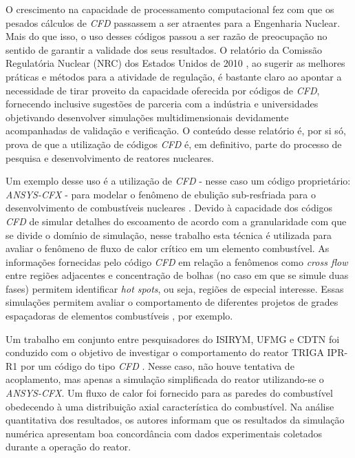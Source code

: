 





O crescimento na capacidade de processamento
computacional 
fez com que os pesados cálculos de \textit{CFD} passassem a ser atraentes 
para a Engenharia Nuclear. Mais do que isso, o uso desses códigos passou a ser razão 
de preocupação no sentido de garantir a validade dos seus resultados. O relatório 
da Comissão Regulatória Nuclear (NRC) dos Estados Unidos de 2010 \cite[p.69]{NUREG2010}, 
ao sugerir as melhores práticas e métodos para a atividade de regulação, é bastante claro 
ao apontar a necessidade de tirar proveito da capacidade oferecida por códigos de \textit{CFD}, 
fornecendo inclusive sugestões de parceria com a indústria e universidades objetivando 
desenvolver simulações multidimensionais devidamente acompanhadas de validação e
verificação. O conteúdo desse relatório é, por si só, prova de que a utilização de 
códigos \textit{CFD} é, em definitivo, parte do processo de 
pesquisa e desenvolvimento de reatores nucleares. 

Um exemplo desse uso é a utilização de \textit{CFD} - nesse caso um código proprietário: 
\textit{ANSYS-CFX} - para modelar o fenômeno de ebulição sub-resfriada para o 
desenvolvimento de combustíveis nucleares \cite{Krepper2007}. Devido à capacidade 
dos códigos \textit{CFD} de simular detalhes do escoamento de acordo com a granularidade com que se
divide o domínio de simulação, nesse trabalho esta técnica é utilizada para avaliar 
o fenômeno de fluxo de calor crítico em um elemento combustível. As informações 
fornecidas pelo código \textit{CFD} em relação a fenômenos como \textit{cross flow} entre 
regiões adjacentes e concentração de bolhas (no caso em que se simule duas fases)
permitem identificar \textit{hot spots}, ou seja, regiões de especial interesse.
Essas simulações permitem avaliar o comportamento
de diferentes projetos de grades espaçadoras de elementos combustíveis \cite{Navarro2011}, por exemplo.

Um trabalho em conjunto entre pesquisadores do ISIRYM, UFMG e CDTN foi conduzido
com o objetivo de investigar o comportamento do reator TRIGA IPR-R1 por um código do tipo \textit{CFD} \cite{Martinez2012}. 
Nesse caso, não houve tentativa de acoplamento, mas apenas a simulação simplificada 
do reator utilizando-se o \textit{ANSYS-CFX}. Um fluxo de calor 
foi fornecido para as paredes do combustível obedecendo à uma distribuição axial 
característica do combustível. Na análise quantitativa dos resultados, os autores 
informam que os resultados da simulação numérica apresentam boa concordância com 
dados experimentais coletados durante a operação do reator.


